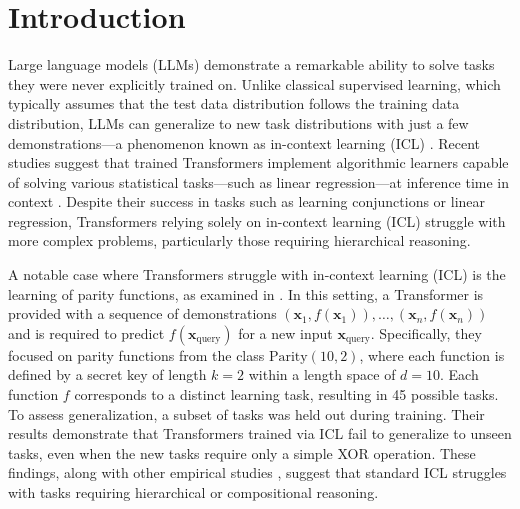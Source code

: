 \section{Introduction}




Large language models (LLMs) demonstrate a remarkable ability to solve tasks they were never explicitly trained on. Unlike classical supervised learning, which typically assumes that the test data distribution follows the training data distribution, LLMs can generalize to new task distributions with just a few demonstrations—a phenomenon known as in-context learning (ICL) \citep{brown2020language, wei2022emergent, garg2022can}. Recent studies suggest that trained Transformers implement algorithmic learners capable of solving various statistical tasks—such as linear regression—at inference time in context \citep{li2023transformers, bai2023transformers}. Despite their success in tasks such as learning conjunctions or linear regression, Transformers relying solely on in-context learning (ICL) struggle with more complex problems, particularly those requiring hierarchical reasoning.






A notable case where Transformers struggle with in-context learning (ICL) is the learning of parity functions, as examined in \cite{bhattamishra2024understanding}. In this setting, a Transformer is provided with a sequence of demonstrations $
(\bm{x}_1, f(\bm{x}_1)), \dots, (\bm{x}_n, f(\bm{x}_n))
$
and is required to predict \( f(\bm{x}_{\mathrm{query}}) \) for a new input \( \bm{x}_{\mathrm{query}} \). Specifically, they focused on parity functions from the class \( \text{Parity}(10,2) \), where each function is defined by a secret key of length \( k=2 \) within a length space of \( d=10 \). Each function \( f \) corresponds to a distinct learning task, resulting in 45 possible tasks. To assess generalization, a subset of tasks was held out during training. Their results demonstrate that Transformers trained via ICL fail to generalize to unseen tasks, even when the new tasks require only a simple XOR operation. These findings, along with other empirical studies \cite{an2023context, xu2024do}, suggest that standard ICL struggles with tasks requiring hierarchical or compositional reasoning.




